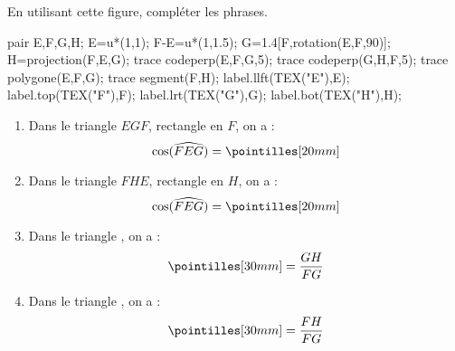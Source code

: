 \begin{exercice*}
    En utilisant cette figure, compléter les phrases.
    \begin{center}
        \begin{Geometrie}
            pair E,F,G,H;
            E=u*(1,1);
            F-E=u*(1,1.5);
            G=1.4[F,rotation(E,F,90)];
            H=projection(F,E,G);
            trace codeperp(E,F,G,5);
            trace codeperp(G,H,F,5);
            trace polygone(E,F,G);
            trace segment(F,H);
            label.llft(TEX("E"),E);
            label.top(TEX("F"),F);
            label.lrt(TEX("G"),G);
            label.bot(TEX("H"),H);
        \end{Geometrie}
    \end{center}
    \begin{enumerate}
        \item Dans le triangle $EGF$, rectangle en $F$, on a : $$\text{cos}(\widehat{FEG})=\pointilles[20mm]$$
        \item Dans le triangle $FHE$, rectangle en $H$, on a : $$\text{cos}(\widehat{FEG})=\pointilles[20mm]$$
        \item Dans le triangle \pointilles[40mm], on a : $$\pointilles[30mm]=\dfrac{GH}{FG}$$
        \item Dans le triangle \pointilles[40mm], on a : $$\pointilles[30mm]=\dfrac{FH}{FG}$$
    \end{enumerate}
\end{exercice*}
